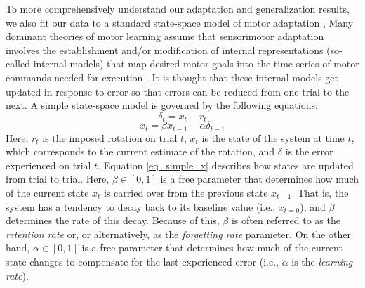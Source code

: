 \documentclass[man, 11pt, longtable, floatsintext, notab]{apa6}
\begin{document}
To more comprehensively understand our adaptation and
generalization results, we also fit our data to a standard
state-space model of motor adaptation
\cite{thoroughman_learning_2000}, \cite{cheng_modeling_2006}
Many dominant theories of motor learning assume that
sensorimotor adaptation involves the establishment and/or
modification of internal representations (so-called internal
models) that map desired motor goals into the time series of
motor commands needed for execution
\cite{wolpert_internal_1998}. It is thought that these
internal models get updated in response to error so that
errors can be reduced from one trial to the next. A simple
state-space model is governed by the following equations:
\begin{equation}
  \delta_{t} = x_{t} - r_{t}
  \label{eq_simple_err}
\end{equation}
\begin{equation}
  x_{t} = \beta x_{t-1} - \alpha \delta_{t-1}
  \label{eq_simple_x}
\end{equation}
Here, $r_t$ is the imposed rotation on trial $t$, $x_t$ is
the state of the system at time $t$, which corresponds to
the current estimate of the rotation, and $\delta$ is the
error experienced on trial $t$. Equation \ref{eq_simple_x}
describes how states are updated from trial to trial. Here,
$\beta \in [0,1]$ is a free parameter that
determines how much of the current state $x_t$ is carried
over from the previous state $x_{t-1}$. That is, the system
has a tendency to decay back to its baseline value (i.e.,
$x_{t=0}$), and $\beta$ determines the rate of this decay.
Because of this, $\beta$ is often referred to as the
\emph{retention rate} or, or alternatively, as the
\emph{forgetting rate} parameter. On the other hand, $\alpha
\in [0,1]$ is a free parameter that determines how much of
the current state changes to compensate for the last
experienced error (i.e., $\alpha$ is the \emph{learning
rate}).
\end{document}

